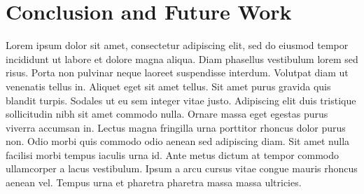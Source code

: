 \section{Conclusion and Future Work}

Lorem ipsum dolor sit amet, consectetur adipiscing elit, sed do eiusmod tempor
incididunt ut labore et dolore magna aliqua. Diam phasellus vestibulum lorem
sed risus. Porta non pulvinar neque laoreet suspendisse interdum. Volutpat diam
ut venenatis tellus in. Aliquet eget sit amet tellus. Sit amet purus gravida
quis blandit turpis. Sodales ut eu sem integer vitae justo. Adipiscing elit
duis tristique sollicitudin nibh sit amet commodo nulla. Ornare massa eget
egestas purus viverra accumsan in. Lectus magna fringilla urna porttitor
rhoncus dolor purus non. Odio morbi quis commodo odio aenean sed adipiscing
diam. Sit amet nulla facilisi morbi tempus iaculis urna id. Ante metus dictum
at tempor commodo ullamcorper a lacus vestibulum. Ipsum a arcu cursus vitae
congue mauris rhoncus aenean vel. Tempus urna et pharetra pharetra massa massa
ultricies.

